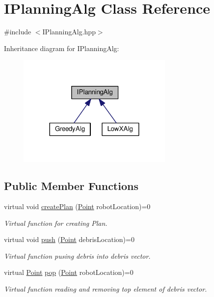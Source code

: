 \hypertarget{classIPlanningAlg}{}\section{I\+Planning\+Alg Class Reference}
\label{classIPlanningAlg}


{\ttfamily \#include $<$I\+Planning\+Alg.\+hpp$>$}



Inheritance diagram for I\+Planning\+Alg\+:
\nopagebreak
\begin{figure}[H]
\begin{center}
\leavevmode
\includegraphics[width=216pt]{classIPlanningAlg__inherit__graph}
\end{center}
\end{figure}
\subsection*{Public Member Functions}
\begin{DoxyCompactItemize}
\item 
virtual void \hyperlink{classIPlanningAlg_abae4e6198042e0acf9abec46e624cd14}{create\+Plan} (\hyperlink{classPoint}{Point} robot\+Location)=0
\begin{DoxyCompactList}\small\item\em Virtual function for creating Plan. \end{DoxyCompactList}\item 
virtual void \hyperlink{classIPlanningAlg_a2bda969cf89a041cb9fbbc7574e7b94f}{push} (\hyperlink{classPoint}{Point} debris\+Location)=0
\begin{DoxyCompactList}\small\item\em Virtual function pusing debris into debris vector. \end{DoxyCompactList}\item 
virtual \hyperlink{classPoint}{Point} \hyperlink{classIPlanningAlg_a4f881df301b194754b1b81ddccad1ed4}{pop} (\hyperlink{classPoint}{Point} robot\+Location)=0
\begin{DoxyCompactList}\small\item\em Virtual function reading and removing top element of debris vector. \end{DoxyCompactList}\end{DoxyCompactItemize}


